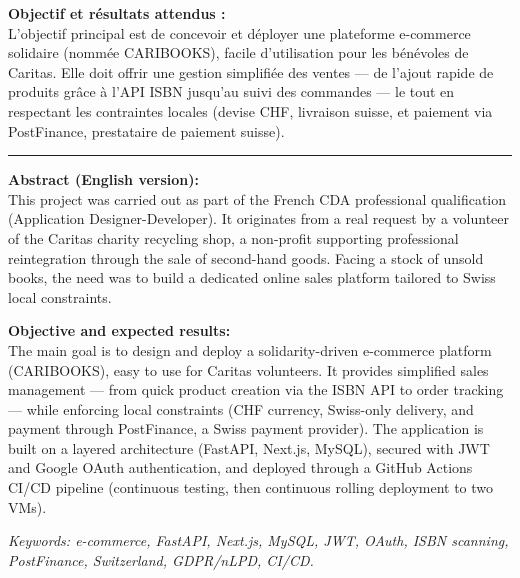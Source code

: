 \documentclass[12pt, a4paper]{report}
\renewcommand{\_}{\origunderscore\allowbreak}
\begin{document}
\vspace{20pt}

\textbf{Objectif et résultats attendus :} \\
L'objectif principal est de concevoir et déployer une plateforme e-commerce solidaire (nommée CARIBOOKS), facile d'utilisation pour les bénévoles de Caritas. Elle doit offrir une gestion simplifiée des ventes — de l'ajout rapide de produits grâce à l'API ISBN jusqu'au suivi des commandes — le tout en respectant les contraintes locales (devise CHF, livraison suisse, et paiement via PostFinance, prestataire de paiement suisse).

\vspace{20pt}

\noindent\rule{\linewidth}{0.4pt}

\vspace{10pt}

\textbf{Abstract (English version):} \\
This project was carried out as part of the French CDA professional qualification (Application Designer-Developer). It originates from a real request by a volunteer of the Caritas charity recycling shop, a non-profit supporting professional reintegration through the sale of second-hand goods. Facing a stock of unsold books, the need was to build a dedicated online sales platform tailored to Swiss local constraints.

\textbf{Objective and expected results:} \\
The main goal is to design and deploy a solidarity-driven e-commerce platform (CARIBOOKS), easy to use for Caritas volunteers. It provides simplified sales management — from quick product creation via the ISBN API to order tracking — while enforcing local constraints (CHF currency, Swiss-only delivery, and payment through PostFinance, a Swiss payment provider). The application is built on a layered architecture (FastAPI, Next.js, MySQL), secured with JWT and Google OAuth authentication, and deployed through a GitHub Actions CI/CD pipeline (continuous testing, then continuous rolling deployment to two VMs).

\vspace{6pt}

\noindent\textit{Keywords: e-commerce, FastAPI, Next.js, MySQL, JWT, OAuth, ISBN scanning, PostFinance, Switzerland, GDPR/nLPD, CI/CD.}

\newpage

\tableofcontents
\newpage
\end{document}
